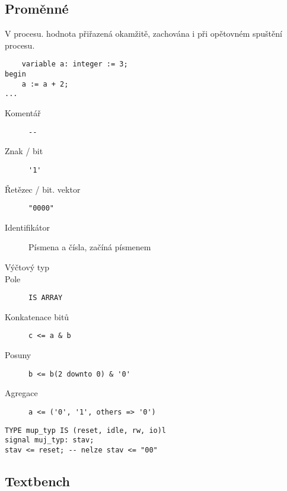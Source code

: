 \documentclass[a4paper, 11pt]{report}
\begin{document}
\subsection{Proměnné}

V procesu. hodnota přiřazená okamžitě, zachována i při opětovném spuštění procesu.

\begin{lstlisting}
	variable a: integer := 3;
begin
	a := a + 2;
...
\end{lstlisting}

\begin{description}
	\item[Komentář] \verb|--|
	\item[Znak / bit] \verb|'1'|
	\item[Řetězec / bit. vektor] \verb|"0000"|
	\item[Identifikátor] Písmena a čísla, začíná písmenem
	\item[Výčtový typ]
	\item[Pole] \verb|IS ARRAY|
	\item[Konkatenace bitů] \verb|c <= a & b|
	\item[Posuny] \verb|b <= b(2 downto 0) & '0'|
	\item[Agregace] \verb|a <= ('0', '1', others => '0')|
\end{description}

\begin{lstlisting}
TYPE mup_typ IS (reset, idle, rw, io)l
signal muj_typ: stav;
stav <= reset; -- nelze stav <= "00"
\end{lstlisting}

\subsection{Textbench}





























\end{document}
